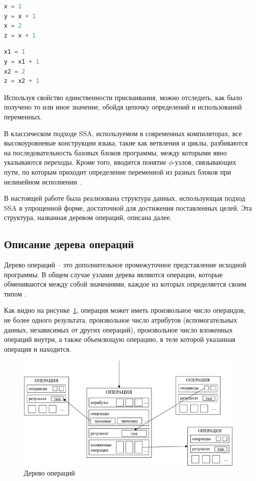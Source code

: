 \begin{lstlisting}[language=Python, caption=Программа в произвольной форме]
x = 1
y = x + 1
x = 2
z = x + 1
\end{lstlisting}

\begin{lstlisting}[language=Python, caption=Программа в форме SSA]
x1 = 1
y = x1 + 1
x2 = 2
z = x2 + 1
\end{lstlisting}

Используя свойство единственности присваивания, можно отследить, как было получено то или иное значение, обойдя цепочку определений и использований переменных.

В классическом подходе SSA, используемом в современных компиляторах, все высокоуровневые конструкции языка, такие как ветвления и циклы, разбиваются на последовательность базовых блоков программы, между которыми явно указываются переходы.
Кроме того, вводится понятие \(\phi\)-узлов, связывающих пути, по которым приходит определение переменной из разных блоков при нелинейном исполнении \cite{vladimirov}.

В настоящей работе была реализована структура данных, использующая подход SSA в упрощенной форме, достаточной для достижения поставленных целей.
Эта структура, названная деревом операций, описана далее.

\subsection{Описание дерева операций}

Дерево операций -- это дополнительное промежуточное представление исходной программы.
В общем случае узлами дерева являются операции, которые обмениваются между собой значениями, каждое из которых определяется своим типом \cite{mlir_intro}.

Как видно на рисунке~\ref{fig:optree_scheme}, операция может иметь произвольное число операндов, не более одного результата, произвольное число атрибутов (вспомогательных данных, независимых от других операций), произвольное число вложенных операций внутри, а также объемлющую операцию, в теле которой указанная операция и находится.

\begin{figure}[h]
    \centering
    \includegraphics[width=\textwidth]{images/optree-scheme.png}
    \caption{Дерево операций}
    \label{fig:optree_scheme}
\end{figure}

